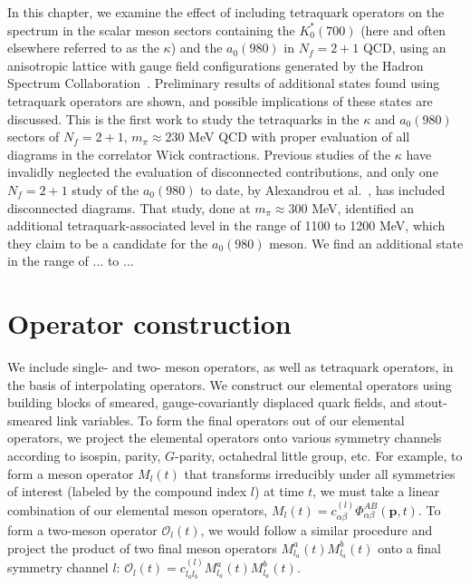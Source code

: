 In this chapter, we examine the effect of including tetraquark operators on the spectrum in the scalar meson sectors containing the $K_0^*(700)$ (here and often elsewhere referred to as the $\kappa$) and the $a_0(980)$ in $N_f = 2 + 1$ QCD, using an anisotropic lattice with gauge field configurations generated by the Hadron Spectrum Collaboration~\cite{}. Preliminary results of  additional states found using tetraquark operators are shown, and possible implications of these states are discussed. This is the first work to study the tetraquarks in the $\kappa$ and $a_0(980)$ sectors of $N_f = 2 + 1$, $m_\pi \approx 230$ MeV QCD with proper evaluation of all diagrams in the correlator Wick contractions. Previous studies of the $\kappa$  have invalidly neglected the evaluation of disconnected contributions, and only one $N_f = 2 + 1$ study of the $a_0(980)$ to date, by Alexandrou et al.~\cite{}, has included disconnected diagrams. That study, done at $m_\pi \approx 300$ MeV, identified an additional tetraquark-associated level in the range of 1100 to 1200 MeV, which they claim to be a candidate for the $a_0(980)$ meson. We find an additional state in the range of ... to ...

\section{Operator construction}
We include single- and two- meson operators, as well as tetraquark operators, in the basis of interpolating operators. We construct our elemental operators using building blocks of smeared, gauge-covariantly displaced quark fields, and stout-smeared link variables. To form the final operators out of our elemental operators, we project the elemental operators onto various symmetry channels according to isospin, parity, $G$-parity, octahedral little group, etc. For example, to form a meson operator $M_{l}(t)$ that transforms irreducibly under all symmetries of interest (labeled by the compound index $l$) at time $t$, we must 
take a linear combination of our elemental meson operators, $M_{l}(t)=c_{\alpha \beta}^{(l)} \Phi_{\alpha \beta}^{A B}(\boldsymbol{p}, t)$. To form a two-meson operator $\mathcal{O}_l(t)$, we would follow a similar procedure and project the product of two final meson operators $M^{a}_{l_a}(t) M^{b}_{l_a}(t)$ onto a final symmetry channel $l$: $\mathcal{O}_l(t) = c^{(l)}_{l_a l_b} M^{a}_{l_a}(t) M^{b}_{l_a}(t)$. 


